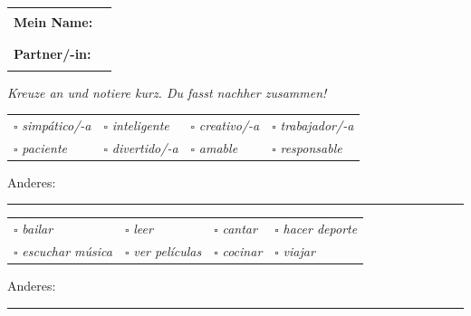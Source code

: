 \documentclass[11pt, a4paper]{article}
\begin{document}
\begin{tabular}{@{}ll@{}}
\textbf{Mein Name:} & \rule{5cm}{0.4pt} \\[0.3cm]
\textbf{Partner/-in:} & \rule{5cm}{0.4pt} \\
\end{tabular}

\vspace{0.5cm}

{\small\textit{Kreuze an und notiere kurz. Du fasst nachher zusammen!}}

\vspace{0.5cm}

\begin{tcolorbox}[colback=gruppeB!10, colframe=gruppeB, boxrule=0.5pt, title={\small\bfseries 1. ¿Cómo eres? (Charakter)}]
\begin{tabular}{@{}p{3.5cm}p{3.5cm}p{3.5cm}p{3.5cm}@{}}
$\square$ \textit{simpático/-a} & $\square$ \textit{inteligente} & $\square$ \textit{creativo/-a} & $\square$ \textit{trabajador/-a} \\
$\square$ \textit{paciente} & $\square$ \textit{divertido/-a} & $\square$ \textit{amable} & $\square$ \textit{responsable} \\
\end{tabular}
\vspace{0.1cm}

Anderes: \rule{8cm}{0.4pt}
\end{tcolorbox}

\vspace{0.2cm}

\begin{tcolorbox}[colback=gruppeB!10, colframe=gruppeB, boxrule=0.5pt, title={\small\bfseries 2. ¿Qué te gusta hacer? (Hobbys/Freizeit)}]
\begin{tabular}{@{}p{3.5cm}p{3.5cm}p{3.5cm}p{3.5cm}@{}}
$\square$ \textit{bailar} & $\square$ \textit{leer} & $\square$ \textit{cantar} & $\square$ \textit{hacer deporte} \\
$\square$ \textit{escuchar música} & $\square$ \textit{ver películas} & $\square$ \textit{cocinar} & $\square$ \textit{viajar} \\
\end{tabular}
\vspace{0.1cm}

Anderes: \rule{8cm}{0.4pt}
\end{tcolorbox}

\vspace{0.2cm}
\end{document}
